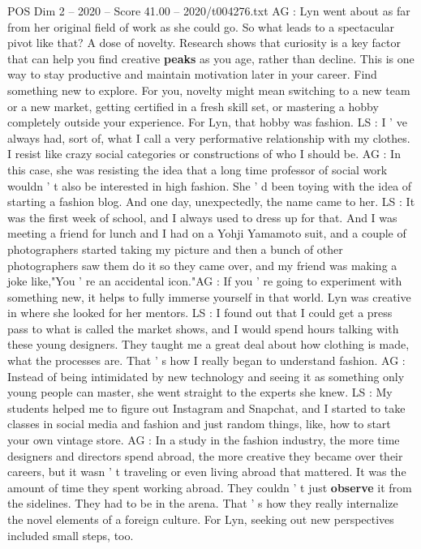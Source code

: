 \begin{textsample}{POS Dim 2 – 2020 – Score 41.00 – 2020/t004276.txt}
AG : Lyn went about as far from her original field of work as she could go.
So what leads to a spectacular pivot like that?
A dose of novelty.
Research shows that curiosity is a key factor that can help you find creative \textbf{peaks} as you age, rather than decline.
This is one way to stay productive and maintain motivation later in your career.
Find something new to explore.
For you, novelty might mean switching to a new team or a new market, getting certified in a fresh skill set, or mastering a hobby completely outside your experience.
For Lyn, that hobby was fashion.
LS : I ' ve always had, sort of, what I call a very performative relationship with my clothes.
I resist like crazy social categories or constructions of who I should be.
AG : In this case, she was resisting the idea that a long time professor of social work wouldn ' t also be interested in high fashion.
She ' d been toying with the idea of starting a fashion blog.
And one day, unexpectedly, the name came to her.
LS : It was the first week of school, and I always used to dress up for that.
And I was meeting a friend for lunch and I had on a Yohji Yamamoto suit, and a couple of photographers started taking my picture and then a bunch of other photographers saw them do it so they came over, and my friend was making a joke like,"You ' re an accidental icon."AG : If you ' re going to experiment with something new, it helps to fully immerse yourself in that world.
Lyn was creative in where she looked for her mentors.
LS : I found out that I could get a press pass to what is called the market shows, and I would spend hours talking with these young designers.
They taught me a great deal about how clothing is made, what the processes are.
That ' s how I really began to understand fashion.
AG : Instead of being intimidated by new technology and seeing it as something only young people can master, she went straight to the experts she knew.
LS : My students helped me to figure out Instagram and Snapchat, and I started to take classes in social media and fashion and just random things, like, how to start your own vintage store.
AG : In a study in the fashion industry, the more time designers and directors spend abroad, the more creative they became over their careers, but it wasn ' t traveling or even living abroad that mattered.
It was the amount of time they spent working abroad.
They couldn ' t just \textbf{observe} it from the sidelines.
They had to be in the arena.
That ' s how they really internalize the novel elements of a foreign culture.
For Lyn, seeking out new perspectives included small steps, too.

\end{textsample}
